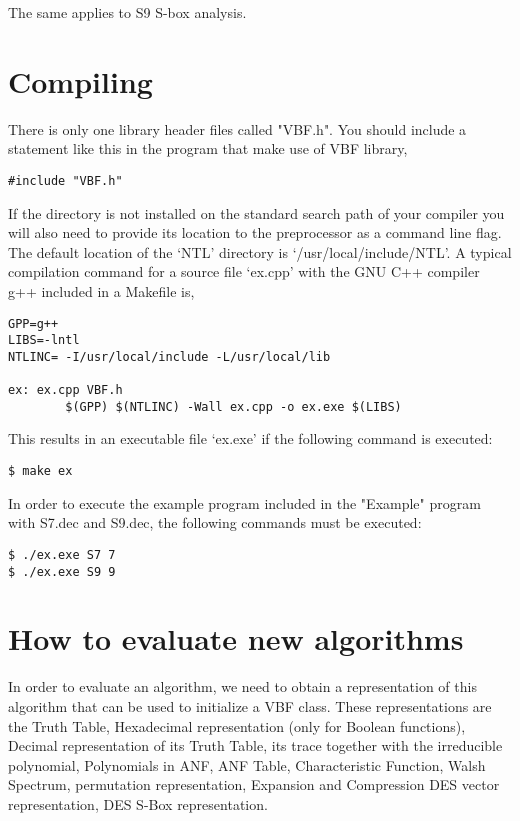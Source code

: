 The same applies to S9 S-box analysis.

\section{Compiling}\label{sec:Compiling}

There is only one library header files called "VBF.h". You should include a statement like this in the program that make use of VBF library,

\begin{verbatim}
#include "VBF.h"
\end{verbatim}

If the directory is not installed on the standard search path of your compiler you will also need to provide its location to the preprocessor as a command line flag. The default location of the ‘NTL’ directory is ‘/usr/local/include/NTL’. A typical compilation command for a source file ‘ex.cpp’ with the GNU C++ compiler g++ included in a Makefile is,
\begin{verbatim}
GPP=g++
LIBS=-lntl
NTLINC= -I/usr/local/include -L/usr/local/lib

ex: ex.cpp VBF.h
        $(GPP) $(NTLINC) -Wall ex.cpp -o ex.exe $(LIBS)
\end{verbatim}

This results in an executable file ‘ex.exe’ if the following command is executed:

\begin{verbatim}
$ make ex
\end{verbatim}

In order to execute the example program included in the "Example" program with S7.dec and S9.dec, the following commands must be executed:

\begin{verbatim}
$ ./ex.exe S7 7
$ ./ex.exe S9 9
\end{verbatim}

\section{How to evaluate new algorithms}\label{sec:EvaluateNew}

In order to evaluate an algorithm, we need to obtain a representation of this algorithm that can be used to initialize a VBF class. These representations are the Truth Table, Hexadecimal representation (only for Boolean functions), Decimal representation of its Truth Table, its trace together with the irreducible polynomial, Polynomials in ANF, ANF Table, Characteristic Function, Walsh Spectrum, permutation representation, Expansion and Compression DES vector representation, DES S-Box representation.


